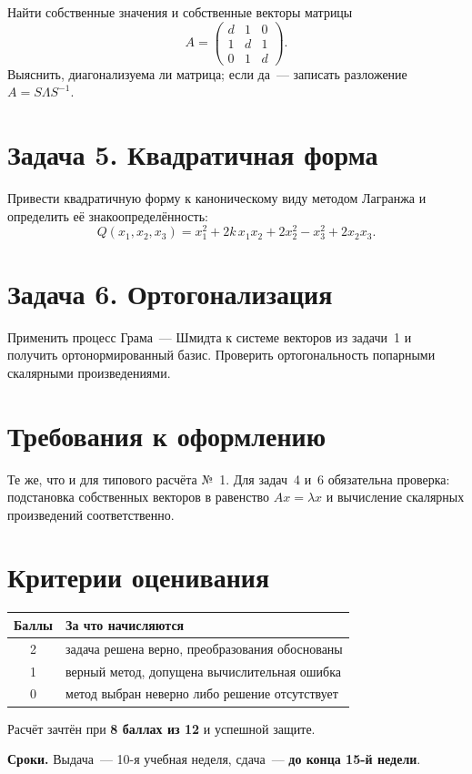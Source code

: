 \documentclass[12pt, a4paper]{article}
\begin{document}
Найти собственные значения и собственные векторы матрицы
\[
A = \begin{pmatrix} d & 1 & 0 \\ 1 & d & 1 \\ 0 & 1 & d \end{pmatrix}.
\]
Выяснить, диагонализуема ли матрица; если да~--- записать разложение
$A = S\Lambda S^{-1}$.

\section*{Задача 5. Квадратичная форма}

Привести квадратичную форму к каноническому виду методом Лагранжа
и определить её знакоопределённость:
\[
Q(x_1, x_2, x_3) = x_1^2 + 2k\,x_1x_2 + 2x_2^2 - x_3^2 + 2x_2x_3.
\]

\section*{Задача 6. Ортогонализация}

Применить процесс Грама~--- Шмидта к системе векторов из задачи~1
и получить ортонормированный базис. Проверить ортогональность
попарными скалярными произведениями.

\vspace{1.2em}

\section*{Требования к оформлению}

Те же, что и для типового расчёта №~1. Для задач~4 и~6 обязательна проверка:
подстановка собственных векторов в равенство $Ax = \lambda x$ и вычисление
скалярных произведений соответственно.

\section*{Критерии оценивания}

\begin{center}
\begin{tabular}{|c|l|}
  \hline
  Баллы & За что начисляются \\
  \hline
  2 & задача решена верно, преобразования обоснованы \\
  1 & верный метод, допущена вычислительная ошибка \\
  0 & метод выбран неверно либо решение отсутствует \\
  \hline
\end{tabular}
\end{center}

\vspace{0.5em}
\noindent
Расчёт зачтён при \textbf{8 баллах из 12} и успешной защите.

\vspace{0.7em}
\noindent\textbf{Сроки.} Выдача~--- 10-я учебная неделя,
сдача~--- \textbf{до конца 15-й недели}.
\end{document}

